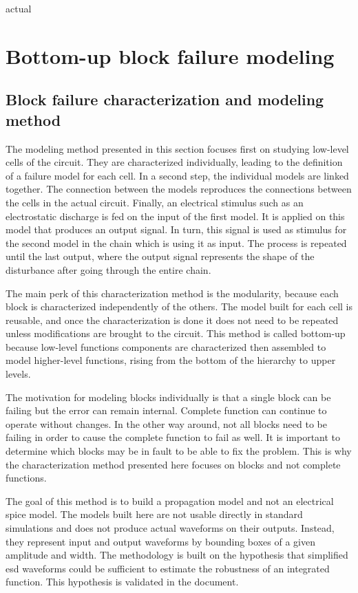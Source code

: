 actual\section{Bottom-up block failure modeling}
\label{sec:bottom-up-modeling}

\subsection{Block failure characterization and modeling method}
\label{sec:block-failure-cz}

The modeling method presented in this section focuses first on studying low-level cells of the circuit.
They are characterized individually, leading to the definition of a failure model for each cell.
In a second step, the individual models are linked together.
The connection between the models reproduces the connections between the cells in the actual circuit.
Finally, an electrical stimulus such as an electrostatic discharge is fed on the input of the first model.
It is applied on this model that produces an output signal.
In turn, this signal is used as stimulus for the second model in the chain which is using it as input.
The process is repeated until the last output, where the output signal represents the shape of the disturbance after going through the entire chain.

The main perk of this characterization method is the modularity, because each block is characterized independently of the others.
The model built for each cell is reusable, and once the characterization is done it does not need to be repeated unless modifications are brought to the circuit.
This method is called bottom-up because low-level functions components are characterized then assembled to model higher-level functions, rising from the bottom of the hierarchy to upper levels.

The motivation for modeling blocks individually is that a single block can be failing but the error can remain internal.
Complete function can continue to operate without changes.
In the other way around, not all blocks need to be failing in order to cause the complete function to fail as well.
It is important to determine which blocks may be in fault to be able to fix the problem.
This is why the characterization method presented here focuses on blocks and not complete functions.

The goal of this method is to build a propagation model and not an electrical \gls{spice} model.
The models built here are not usable directly in standard simulations and does not produce actual waveforms on their outputs.
Instead, they represent input and output waveforms by bounding boxes of a given amplitude and width.
The methodology is built on the hypothesis that simplified \gls{esd} waveforms could be sufficient to estimate the robustness of an integrated function.
This hypothesis is validated in the document.

